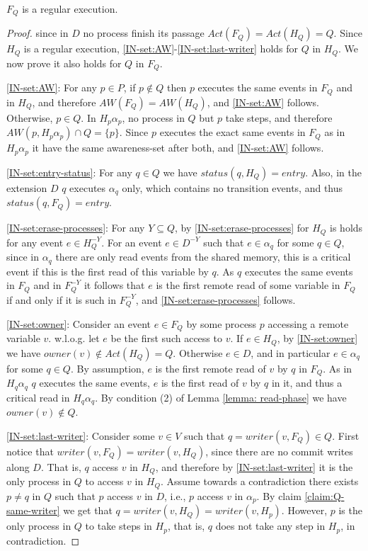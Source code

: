 \begin{claim-subsection}
	$F_Q$ is a regular execution.
\end{claim-subsection}

\begin{proof}
	since in $D$ no process finish its passage $Act(F_Q) = Act(H_Q) = Q$. Since $H_Q$ is a regular execution, \ref{IN-set:AW}-\ref{IN-set:last-writer} holds for $Q$ in $H_Q$. We now prove it also holds for $Q$ in $F_Q$.
	
	\ref{IN-set:AW}: For any $p \in P$, if $p \notin Q$ then $p$ executes the same events in $F_Q$ and in $H_Q$, and therefore $AW(F_Q) = AW(H_Q)$, and \ref{IN-set:AW} follows. Otherwise, $p \in Q$. In $H_p \alpha_p$, no process in $Q$ but $p$ take steps, and therefore $AW(p, H_p \alpha_p) \cap Q = \{p\}$. Since $p$ executes the exact same events in $F_Q$ as in $H_p \alpha_p$ it have the same awareness-set after both, and \ref{IN-set:AW} follows.
	
	\ref{IN-set:entry-status}: For any $q \in Q$ we have $status(q,H_Q) = entry$. Also, in the extension $D$ $q$ executes $\alpha_q$ only, which contains no transition events, and thus $status(q,F_Q) = entry$.
	
	\ref{IN-set:erase-processes}: For any $Y \subseteq Q$, by \ref{IN-set:erase-processes} for $H_Q$ is holds for any event $e \in H_Q^{-Y}$. For an event $e \in D^{-Y}$ such that $e \in \alpha_q$ for some $q \in Q$, since in $\alpha_q$ there are only read events from the shared memory, this is a critical event if this is the first read of this variable by $q$. As $q$ executes the same events in $F_Q$ and in $F_Q^{-Y}$ it follows that $e$ is the first remote read of some variable in $F_Q$ if and only if it is such in $F_Q^{-Y}$, and \ref{IN-set:erase-processes} follows.
	
	\ref{IN-set:owner}: Consider an event $e \in F_Q$ by some process $p$ accessing a remote variable $v$. w.l.o.g. let $e$ be the first such access to $v$. If $e \in H_Q$, by \ref{IN-set:owner} we have $owner(v) \notin Act(H_Q) = Q$.
	Otherwise $e \in D$, and in particular $e \in \alpha_q$ for some $q \in Q$. By assumption, $e$ is the first remote read of $v$ by $q$ in $F_Q$. As in $H_q \alpha_q$ $q$ executes the same events, $e$ is the first read of $v$ by $q$ in it, and thus a critical read in $H_q \alpha_q$. By condition (2) of Lemma \ref{lemma: read-phase} we have $owner(v) \notin Q$.
	
	\ref{IN-set:last-writer}: Consider some $v \in V$ such that $q = writer(v,F_Q) \in Q$. First notice that $writer(v,F_Q) = writer(v,H_Q)$, since there are no commit writes along $D$.
	That is, $q$ access $v$ in $H_Q$, and therefore by \ref{IN-set:last-writer} it is the only process in $Q$ to access $v$ in $H_Q$. Assume towards a contradiction there exists $p \neq q$ in $Q$ such that $p$ access $v$ in $D$, i.e., $p$ access $v$ in $\alpha_p$. By claim \ref{claim:Q-same-writer} we get that $q = writer(v,H_Q) = writer(v,H_p)$. However, $p$ is the only process in $Q$ to take steps in $H_p$, that is, $q$ does not take any step in $H_p$, in contradiction.
	
\end{proof}

